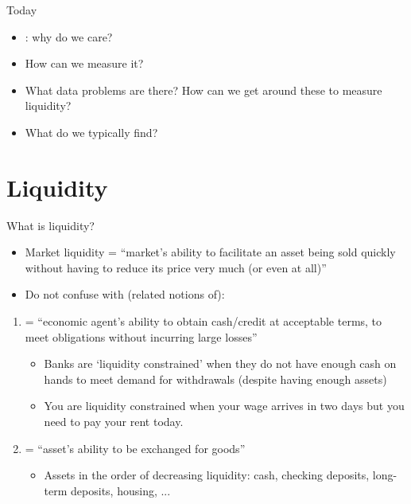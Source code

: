\documentclass[english,10pt
,aspectratio=169
]{beamer}
\begin{document}
\begin{frame}{Today}
	\begin{itemize}
		\item {}: why do we care?
		\item How can we measure it?
		\item What data problems are there? How can we get around these to measure liquidity?
		\item What do we typically find?
	\end{itemize}
\end{frame}


\section{Liquidity}


\begin{frame}{What is liquidity?}
\begin{itemize}
	\item \alert{Market liquidity} = ``market's ability to facilitate an asset being sold quickly without having to reduce its price very much (or even at all)''
	\item Do not confuse with (related notions of):
\end{itemize}
\begin{enumerate}
	\item {} = ``economic agent's ability to obtain cash/credit at acceptable terms, to meet obligations without incurring large losses''
	\begin{itemize}
		\item Banks are `liquidity constrained' when they do not have enough cash on hands to meet demand for withdrawals (despite having enough assets)
		\item You are liquidity constrained when your wage arrives in two days but you need to pay your rent today.
	\end{itemize}
	\item {} = ``asset's ability to be exchanged for goods''
	\begin{itemize}
		\item Assets in the order of decreasing liquidity: cash, checking deposits, long-term deposits, housing, ...
	\end{itemize}
\end{enumerate}
\end{frame}
\end{document}
